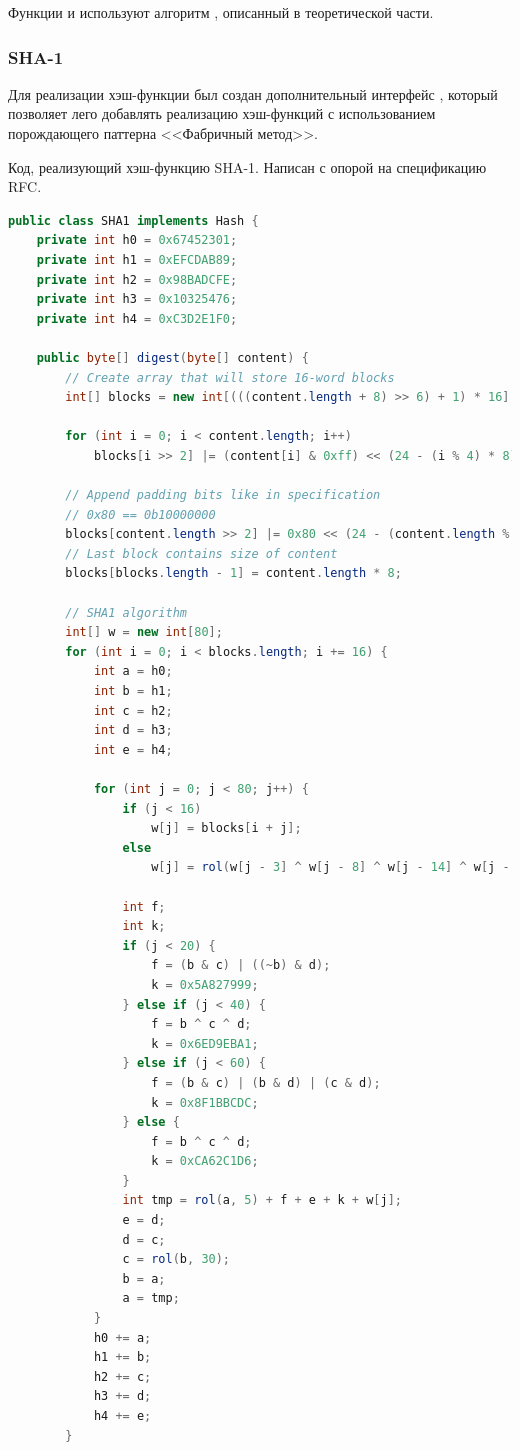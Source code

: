 Функции  и  используют алгоритм , описанный в теоретической части.

\subsubsection{SHA-1}

Для реализации хэш-функции был создан дополнительный интерфейс , который позволяет лего добавлять реализацию хэш-функций
с использованием порождающего паттерна <<Фабричный метод>>.

Код, реализующий хэш-функцию SHA-1. Написан с опорой на спецификацию RFC\cite{SHA1Specs}.
\begin{lstlisting}[language=Java]
public class SHA1 implements Hash {
    private int h0 = 0x67452301;
    private int h1 = 0xEFCDAB89;
    private int h2 = 0x98BADCFE;
    private int h3 = 0x10325476;
    private int h4 = 0xC3D2E1F0;

    public byte[] digest(byte[] content) {
        // Create array that will store 16-word blocks
        int[] blocks = new int[(((content.length + 8) >> 6) + 1) * 16];

        for (int i = 0; i < content.length; i++)
            blocks[i >> 2] |= (content[i] & 0xff) << (24 - (i % 4) * 8);
          
        // Append padding bits like in specification
        // 0x80 == 0b10000000
        blocks[content.length >> 2] |= 0x80 << (24 - (content.length % 4) * 8);
        // Last block contains size of content
        blocks[blocks.length - 1] = content.length * 8;

        // SHA1 algorithm
        int[] w = new int[80];
        for (int i = 0; i < blocks.length; i += 16) {
            int a = h0;
            int b = h1;
            int c = h2;
            int d = h3;
            int e = h4;

            for (int j = 0; j < 80; j++) {
                if (j < 16)
                    w[j] = blocks[i + j];
                else
                    w[j] = rol(w[j - 3] ^ w[j - 8] ^ w[j - 14] ^ w[j - 16], 1);

                int f;
                int k;
                if (j < 20) {
                    f = (b & c) | ((~b) & d);
                    k = 0x5A827999;
                } else if (j < 40) {
                    f = b ^ c ^ d;
                    k = 0x6ED9EBA1;
                } else if (j < 60) {
                    f = (b & c) | (b & d) | (c & d);
                    k = 0x8F1BBCDC;
                } else {
                    f = b ^ c ^ d;
                    k = 0xCA62C1D6;
                }
                int tmp = rol(a, 5) + f + e + k + w[j];
                e = d;
                d = c;
                c = rol(b, 30);
                b = a;
                a = tmp;
            }
            h0 += a;
            h1 += b;
            h2 += c;
            h3 += d;
            h4 += e;
        }


\end{lstlisting}
